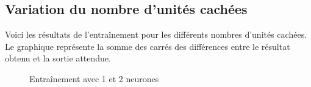 \documentclass[12pt,letterpaper]{article}
\begin{document}
\subsection{Variation du nombre d'unités cachées}
Voici les résultats de l'entraînement pour les différents nombres d'unités cachées. Le graphique représente la somme des carrés des différences entre le résultat obtenu et la sortie attendue.
\begin{figure}
    \centering
    \hspace*{0.5in}
    \caption{Entraînement avec 1 et 2 neurones}
    \label{fig:train_1_2}
\end{figure}
\end{document}
